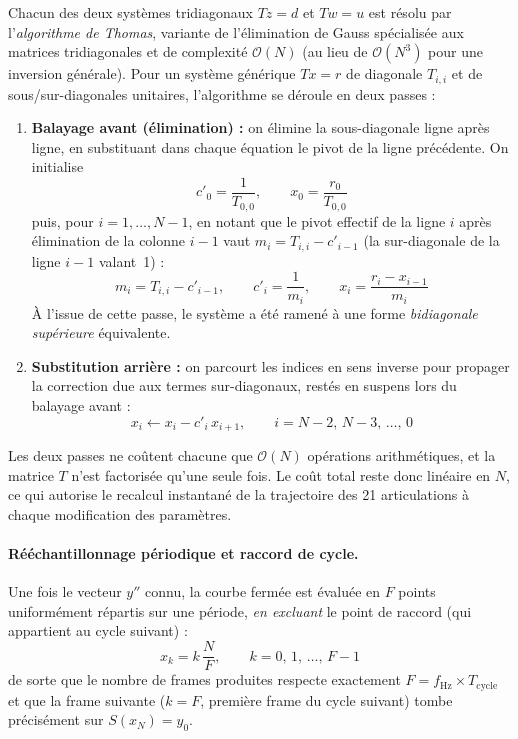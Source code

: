 \documentclass{tropLaClasse}
\begin{document}
Chacun des deux systèmes tridiagonaux $Tz=d$ et $Tw=u$ est résolu par l'\emph{algorithme de Thomas}, variante de l'élimination de Gauss spécialisée aux matrices tridiagonales et de complexité $\mathcal{O}(N)$ (au lieu de $\mathcal{O}(N^3)$ pour une inversion générale). Pour un système générique $T x = r$ de diagonale $T_{i,i}$ et de sous/sur-diagonales unitaires, l'algorithme se déroule en deux passes :

\begin{enumerate}
    \item \textbf{Balayage avant (élimination) :} on élimine la sous-diagonale ligne après ligne, en substituant dans chaque équation le pivot de la ligne précédente. On initialise
    \begin{equation}
        c'_0 = \frac{1}{T_{0,0}}, \qquad x_0 = \frac{r_0}{T_{0,0}}
    \end{equation}
    puis, pour $i = 1, \dots, N-1$, en notant que le pivot effectif de la ligne $i$ après élimination de la colonne $i-1$ vaut $m_i = T_{i,i} - c'_{i-1}$ (la sur-diagonale de la ligne $i-1$ valant~1) :
    \begin{equation}
        m_i = T_{i,i} - c'_{i-1}, \qquad
        c'_i = \frac{1}{m_i}, \qquad
        x_i = \frac{r_i - x_{i-1}}{m_i}
        \label{eq:thomas-forward}
    \end{equation}
    À l'issue de cette passe, le système a été ramené à une forme \emph{bidiagonale supérieure} équivalente.
    \item \textbf{Substitution arrière :} on parcourt les indices en sens inverse pour propager la correction due aux termes sur-diagonaux, restés en suspens lors du balayage avant :
    \begin{equation}
        x_i \leftarrow x_i - c'_i\, x_{i+1}, \qquad i = N-2,\, N-3,\, \dots,\, 0
        \label{eq:thomas-backward}
    \end{equation}
\end{enumerate}
Les deux passes ne coûtent chacune que $\mathcal{O}(N)$ opérations arithmétiques, et la matrice $T$ n'est factorisée qu'une seule fois. Le coût total reste donc linéaire en $N$, ce qui autorise le recalcul instantané de la trajectoire des 21 articulations à chaque modification des paramètres.

\paragraph{Rééchantillonnage périodique et raccord de cycle.} Une fois le vecteur $y''$ connu, la courbe fermée est évaluée en $F$ points uniformément répartis sur une période, \emph{en excluant} le point de raccord (qui appartient au cycle suivant) :
\begin{equation}
    x_k = k\,\frac{N}{F}, \qquad k = 0,\, 1,\, \dots,\, F-1
\end{equation}
de sorte que le nombre de frames produites respecte exactement $F = f_{\mathrm{Hz}} \times T_{\mathrm{cycle}}$ et que la frame suivante ($k = F$, première frame du cycle suivant) tombe précisément sur $S(x_N) = y_0$. 
\end{document}
